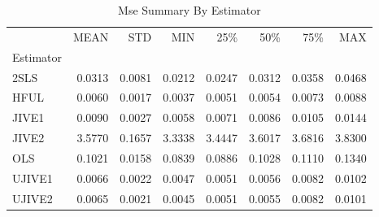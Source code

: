\begin{table}[ht]
\centering
\caption{Mse Summary By Estimator}
\begin{tabular}{lrrrrrrr}
\toprule
 & MEAN & STD & MIN & 25\% & 50\% & 75\% & MAX \\
Estimator &  &  &  &  &  &  &  \\
\midrule
2SLS & 0.0313 & 0.0081 & 0.0212 & 0.0247 & 0.0312 & 0.0358 & 0.0468 \\
HFUL & 0.0060 & 0.0017 & 0.0037 & 0.0051 & 0.0054 & 0.0073 & 0.0088 \\
JIVE1 & 0.0090 & 0.0027 & 0.0058 & 0.0071 & 0.0086 & 0.0105 & 0.0144 \\
JIVE2 & 3.5770 & 0.1657 & 3.3338 & 3.4447 & 3.6017 & 3.6816 & 3.8300 \\
OLS & 0.1021 & 0.0158 & 0.0839 & 0.0886 & 0.1028 & 0.1110 & 0.1340 \\
UJIVE1 & 0.0066 & 0.0022 & 0.0047 & 0.0051 & 0.0056 & 0.0082 & 0.0102 \\
UJIVE2 & 0.0065 & 0.0021 & 0.0045 & 0.0051 & 0.0055 & 0.0082 & 0.0101 \\
\bottomrule
\end{tabular}
\end{table}

